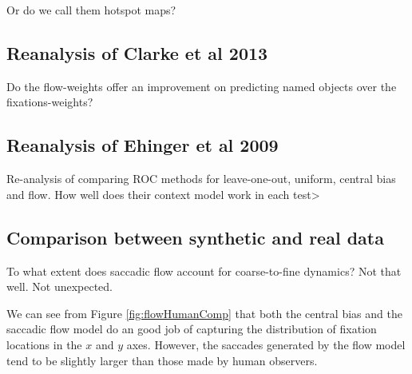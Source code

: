 
Or do we call them hotspot maps?

\subsection{Reanalysis of Clarke et al 2013}
\label{sec:reanalysisClarke2013}
Do the flow-weights offer an improvement on predicting named objects over the fixations-weights?

\subsection{Reanalysis of Ehinger et al 2009}

Re-analysis of \cite{ehinger2009} comparing ROC methods for leave-one-out, uniform, central bias and flow. How well does their context model work in each test>

\subsection{Comparison between synthetic and real data}
\label{sec:humanComp}
To what extent does saccadic flow account for coarse-to-fine dynamics? Not that well. Not unexpected.

We can see from Figure \ref{fig:flowHumanComp} that both the central bias and the saccadic flow model do an good job of capturing the distribution of fixation locations in the $x$ and $y$ axes. However, the saccades generated by the flow model tend to be slightly larger than those made by human observers. 

